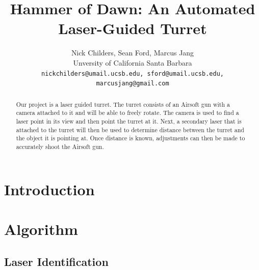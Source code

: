 \documentclass[10pt,twocolumn,letterpaper]{article}
\begin{document}
\title{Hammer of Dawn: An Automated Laser-Guided Turret}

\author{Nick Childers, Sean Ford, Marcus Jang\\
Unversity of California Santa Barbara\\
{\tt\small nickchilders@umail.ucsb.edu, sford@umail.ucsb.edu, marcusjang@gmail.com}
}

\maketitle
\thispagestyle{empty}

\begin{abstract}
Our project is a laser guided turret. The turret consists of an Airsoft gun with a camera attached to it and will be able to freely rotate. The camera is used to find a laser point in its view and then point the turret at it. Next, a secondary laser that is attached to the turret will then be used to determine distance between the turret and the object it is pointing at. Once distance is known, adjustments can then be made to accurately shoot the Airsoft gun.
\end{abstract}


\section{Introduction}


\section{Algorithm}


\subsection{Laser Identification}
\end{document}
